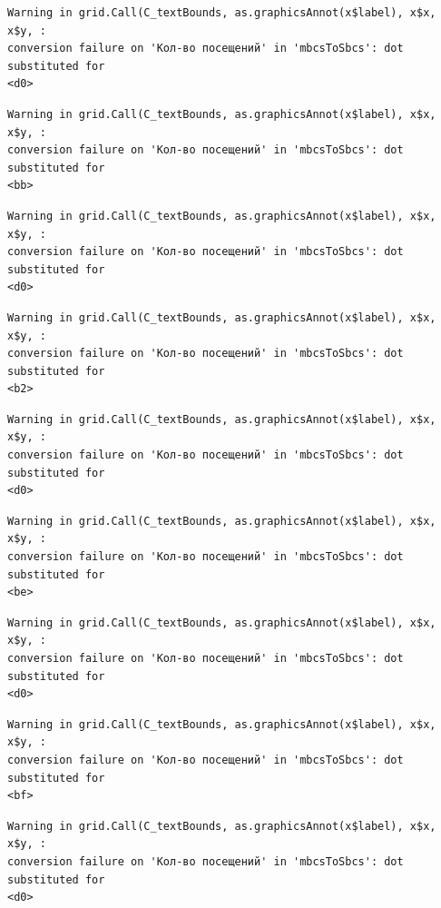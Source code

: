 \documentclass[
  letterpaper,
  DIV=11,
  numbers=noendperiod]{scrartcl}
\begin{document}
\begin{verbatim}
Warning in grid.Call(C_textBounds, as.graphicsAnnot(x$label), x$x, x$y, :
conversion failure on 'Кол-во посещений' in 'mbcsToSbcs': dot substituted for
<d0>
\end{verbatim}

\begin{verbatim}
Warning in grid.Call(C_textBounds, as.graphicsAnnot(x$label), x$x, x$y, :
conversion failure on 'Кол-во посещений' in 'mbcsToSbcs': dot substituted for
<bb>
\end{verbatim}

\begin{verbatim}
Warning in grid.Call(C_textBounds, as.graphicsAnnot(x$label), x$x, x$y, :
conversion failure on 'Кол-во посещений' in 'mbcsToSbcs': dot substituted for
<d0>
\end{verbatim}

\begin{verbatim}
Warning in grid.Call(C_textBounds, as.graphicsAnnot(x$label), x$x, x$y, :
conversion failure on 'Кол-во посещений' in 'mbcsToSbcs': dot substituted for
<b2>
\end{verbatim}

\begin{verbatim}
Warning in grid.Call(C_textBounds, as.graphicsAnnot(x$label), x$x, x$y, :
conversion failure on 'Кол-во посещений' in 'mbcsToSbcs': dot substituted for
<d0>
\end{verbatim}

\begin{verbatim}
Warning in grid.Call(C_textBounds, as.graphicsAnnot(x$label), x$x, x$y, :
conversion failure on 'Кол-во посещений' in 'mbcsToSbcs': dot substituted for
<be>
\end{verbatim}

\begin{verbatim}
Warning in grid.Call(C_textBounds, as.graphicsAnnot(x$label), x$x, x$y, :
conversion failure on 'Кол-во посещений' in 'mbcsToSbcs': dot substituted for
<d0>
\end{verbatim}

\begin{verbatim}
Warning in grid.Call(C_textBounds, as.graphicsAnnot(x$label), x$x, x$y, :
conversion failure on 'Кол-во посещений' in 'mbcsToSbcs': dot substituted for
<bf>
\end{verbatim}

\begin{verbatim}
Warning in grid.Call(C_textBounds, as.graphicsAnnot(x$label), x$x, x$y, :
conversion failure on 'Кол-во посещений' in 'mbcsToSbcs': dot substituted for
<d0>
\end{verbatim}
\end{document}
